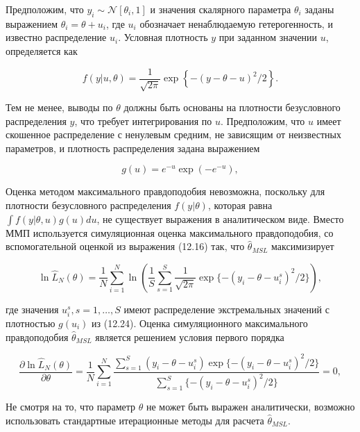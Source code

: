 Предположим, что $y_i{\sim } \mathcal{N}[\theta_i,1]$ и значения скалярного параметра $\theta_i$ заданы выражением $\theta_i=\theta+u_i$, где $u_i$ обозначает ненаблюдаемую гетерогенность, и известно распределение $u_i$. Условная плотность $y$ при заданном значении $u$, определяется как 

\begin{equation}
f(y|u,\theta)=\dfrac{1}{\sqrt{2\pi}}\exp\left\lbrace -(y-\theta-u)^{2}/2\right\rbrace. 
\end{equation}

Тем не менее, выводы по $\theta$ должны быть основаны на плотности безусловного распределения $y$, что требует  интегрирования по $u$. Предположим, что $u$ имеет скошенное распределение с ненулевым средним, не зависящим от неизвестных параметров, и плотность распределения задана выражением

\begin{equation}
g(u)=e^{-u}\exp(-e^{-u}),
\end{equation}

Оценка методом максимального правдоподобия невозможна, поскольку для плотности безусловного распределения $f(y|\theta)$, которая равна $\int{f(y|\theta,u)}g(u)du$, не существует выражения в аналитическом виде. Вместо ММП используется симуляционная оценка максимального правдоподобия, со вспомогательной оценкой из выражения (12.16) так, что $\hat{\theta}_{MSL}$ максимизирует

\begin{equation}
\ln\hat{L}_{N}(\theta)=\dfrac{1}{N}\sum^{N}_{i=1}\ln\left(\dfrac{1}{S}\sum^{S}_{s=1}\dfrac{1}{\sqrt{2\pi}}\exp\lbrace{-(y_i-\theta-u^{s}_i)^{2}/2}\rbrace \right), 
\end{equation}

где значения $u^{s}_{i}, s=1,\ldots ,S$ имеют  распределение экстремальных значений с  плотностью $g(u_i)$ из (12.24). Оценка симуляционного максимального правдоподобия  $\hat{\theta}_{MSL}$ является решением условия первого порядка

\begin{equation}
\dfrac{\partial{\ln\hat{L}_{N}(\theta)}}{\partial\theta}=\dfrac{1}{N}\sum^{N}_{i=1}\dfrac{\sum^{S}_{s=1}(y_i-\theta-u^{s}_i)\exp\lbrace{-(y_i-\theta-u^{s}_{i})^{2}/2}\rbrace}{\sum^{S}_{s=1}\lbrace{-(y_i-\theta-u^{s}_{i})^{2}/2}\rbrace} = 0,
\end{equation}

Не смотря на то, что параметр $\theta$ не может быть выражен аналитически, возможно использовать стандартные итерационные методы для расчета $\hat{\theta}_{MSL}$.

